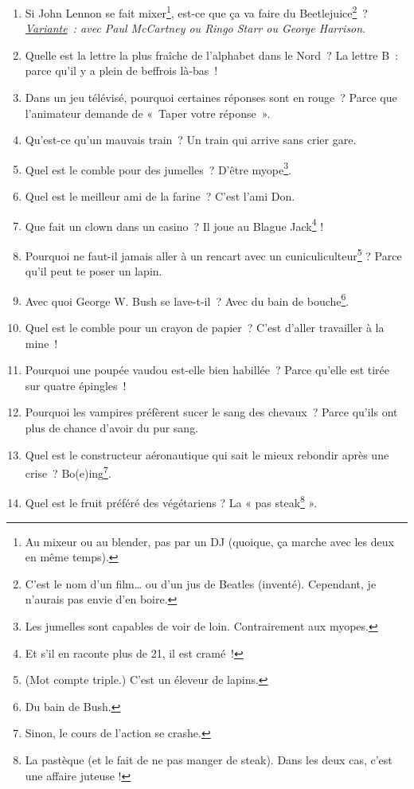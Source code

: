 \documentclass[10pt,a5paper,fullpage]{book}
\begin{document}
\begin{enumerate}
		\item Si John Lennon se fait mixer\footnote{Au mixeur ou au blender, pas par un DJ (quoique, ça marche avec les deux en même temps).}, est-ce que ça va faire du Beetlejuice\footnote{C’est le nom d’un film… ou d’un jus de Beatles (inventé). Cependant, je n'aurais pas envie d'en boire.}~? \\\textit{\underline{Variante}~: avec Paul McCartney ou Ringo Starr ou George Harrison}.
		\item Quelle est la lettre la plus fraîche de l’alphabet dans le Nord~? La lettre B~: parce qu’il y a plein de beffrois là-bas~!
		\item Dans un jeu télévisé, pourquoi certaines réponses sont en rouge~? Parce que l’animateur demande de «~Taper votre réponse~».
		\item Qu’est-ce qu’un mauvais train~?  Un train qui arrive sans crier gare.
		\item Quel est le comble pour des jumelles~? D’être myope\footnote{Les jumelles sont capables de voir de loin. Contrairement aux myopes.}.
		\item Quel est le meilleur ami de la farine~? C’est l’ami Don.
		\item Que fait un clown dans un casino~? Il joue au Blague Jack\footnote{Et s’il en raconte plus de 21, il est cramé~!} !
		\item Pourquoi ne faut-il jamais aller à un rencart avec un cuniculiculteur\footnote{(Mot compte triple.) C'est un éleveur de lapins.} ? Parce qu'il peut te poser un lapin. 
		\item Avec quoi George W. Bush se lave-t-il~? Avec du bain de bouche\footnote{Du bain de Bush.}.  
		\item Quel est le comble pour un crayon de papier~? C'est d'aller travailler à la mine~!
		\item Pourquoi une poupée vaudou est-elle bien habillée~? Parce qu’elle est tirée sur quatre épingles~!
		\item Pourquoi les vampires préfèrent sucer le sang des chevaux~? Parce qu’ils ont plus de chance d’avoir du pur sang. 
		\item Quel est le constructeur aéronautique qui sait le mieux rebondir après une crise~? Bo(e)ing\footnote{Sinon, le cours de l'action se crashe.}.
		\item Quel est le fruit préféré des végétariens ? La « pas steak\footnote{La pastèque (et le fait de ne pas manger de steak). Dans les deux cas, c'est une affaire juteuse !} ».

\end{enumerate}
\end{document}
